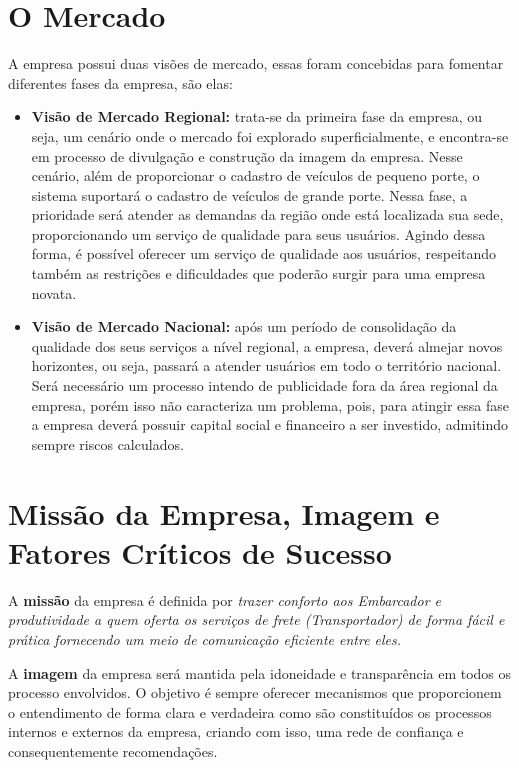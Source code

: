 		
	\section{O Mercado}
	
		A empresa possui duas visões de mercado, essas foram concebidas para fomentar diferentes fases da empresa, são elas:
	
		\begin{itemize}
			
			\item \textbf{Visão de Mercado Regional:} trata-se da primeira fase da empresa, ou seja, um cenário onde o mercado foi explorado superficialmente, e encontra-se em processo de divulgação e construção da imagem da empresa. Nesse cenário, além de proporcionar o cadastro de veículos de pequeno porte, o sistema suportará o cadastro de veículos de grande porte. Nessa fase, a prioridade será atender as demandas da região onde está localizada sua sede, proporcionando um serviço de qualidade para seus usuários. Agindo dessa forma, é possível oferecer um serviço de qualidade aos usuários, respeitando também as restrições e dificuldades que poderão surgir para uma empresa novata.
			
			
			\item \textbf{Visão de Mercado Nacional:} após um período de consolidação da qualidade dos seus serviços a nível regional, a empresa, deverá almejar novos horizontes, ou seja, passará a atender usuários em todo o território nacional. Será necessário um processo intendo de publicidade fora da área regional da empresa, porém isso não caracteriza um problema, pois, para atingir essa fase a empresa deverá possuir capital social e financeiro a ser investido, admitindo sempre riscos calculados.
			
		\end{itemize}
		
		
	\section{Missão da Empresa, Imagem e Fatores Críticos de Sucesso}
	
		A \textbf{missão} da empresa é definida por \emph{trazer conforto aos Embarcador e produtividade a quem oferta os serviços de frete (Transportador) de forma fácil e prática fornecendo um meio de comunicação eficiente entre eles.}
		
		A \textbf{imagem} da empresa será mantida pela idoneidade e transparência em todos os processo envolvidos. O objetivo é sempre oferecer mecanismos que proporcionem o entendimento de forma clara e verdadeira como são constituídos os processos internos e externos da empresa, criando com isso, uma rede de confiança e consequentemente recomendações.
		
